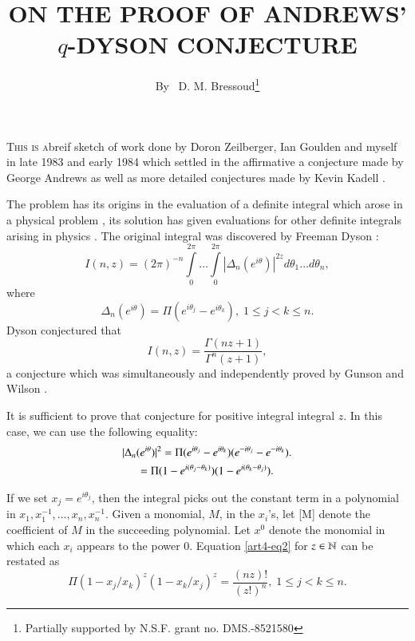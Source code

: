 
\title{ON THE PROOF OF ANDREWS' $q$-DYSON CONJECTURE}

\author{By~  D. M. Bressoud\footnote{Partially supported by N.S.F. grant no. DMS.-8521580}}

\date{}
\maketitle

\setcounter{pageoriginal}{30} 


\textsc{This is a}\pageoriginale breif sketch of work done by Doron Zeilberger, Ian Goulden and myself in late 1983 and early 1984 which settled in the affirmative a conjecture made by George Andrews \cite{art4-key1} as well as more detailed conjectures made by Kevin Kadell \cite{art4-key12}.

The problem has its origins in the evaluation of a definite integral which arose in a physical problem \cite{art4-key5}, its solution has given evaluations for other definite integrals arising in physics \cite{art4-key4}. The original integral was discovered by Freeman Dyson \cite{art4-key5}:
\begin{equation}
I (n,z) = (2\pi)^{-n} \int\limits^{2\pi}_0 \ldots \int\limits^{2\pi}_0 |\Delta_n(e^{i\theta})|^{2z} d \theta_1 \ldots d \theta_n, \label{art4-eq1}
\end{equation}
where 
$$
\Delta_n(e^{i\theta}) = \Pi (e^{i\theta_j} - e^{i\theta_k}), \; 1 \leqslant j < k \leqslant n.
$$
Dyson conjectured that 
\begin{equation}
I (n,z) = \frac{\Gamma (nz+1)}{\Gamma^n (z+1)}, \label{art4-eq2}
\end{equation}
a conjecture which was simultaneously and independently proved by Gunson \cite{art4-key7} and Wilson \cite{art4-key23}.

It is sufficient to prove that conjecture for positive integral integral $z$. In this case, we can use the following equality:
\begin{gather}
|\Delta_n (e^{i\theta})|^2 = \Pi (e^{i\theta_j} - e^{i\theta_k}) (e^{-i\theta_j} - e^{-i\theta_k}).\label{art4-eq3}\\
= \Pi (1-e^{i(\theta_j - \theta_k)}) (1-e^{i(\theta_k -\theta_j)}).\notag
\end{gather}

If we set $x_j =e^{i\theta_j}$, then the integral picks out the constant term in a polynomial in $x_1, x^{-1}_1, \ldots, x_n, x^{-1}_n$. Given a monomial, $M$, in the $x_i$'s, let [M] denote the coefficient of $M$ in the succeeding polynomial. Let $x^0$ denote the monomial in which each $x_i$ appears to the power 0. Equation \eqref{art4-eq2} for $z \in \mathbb{N}$ can be restated as
\begin{equation}
[x^0] \Pi (1-x_j/x_k)^z (1-x_k/x_j)^z = \frac{(nz)!}{(z!)^n}, \; 1 \leqslant j < k \leqslant n. \label{art4-eq4}
\end{equation}\pageoriginale 

